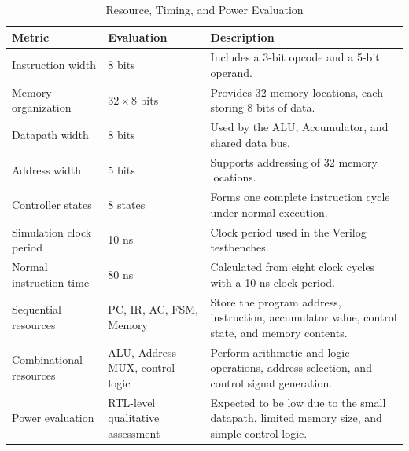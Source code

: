 \begin{table}[htbp]
	\centering
	\caption{Resource, Timing, and Power Evaluation}
	\label{tab:resource_timing_power}
	\small
	\renewcommand{\arraystretch}{1.15}
	\begin{tabularx}{\textwidth}{@{}p{} p{} X@{}}
		\toprule
		\textbf{Metric}         & \textbf{Evaluation}              & \textbf{Description}                                                                           \\
		\midrule
		Instruction width       & 8 bits                           & Includes a 3-bit opcode and a 5-bit operand.                                                   \\

		Memory organization     & \(32 \times 8\) bits             & Provides 32 memory locations, each storing 8 bits of data.                                     \\

		Datapath width          & 8 bits                           & Used by the ALU, Accumulator, and shared data bus.                                             \\

		Address width           & 5 bits                           & Supports addressing of 32 memory locations.                                                    \\

		Controller states       & 8 states                         & Forms one complete instruction cycle under normal execution.                                   \\

		Simulation clock period & 10 ns                            & Clock period used in the Verilog testbenches.                                                  \\

		Normal instruction time & 80 ns                            & Calculated from eight clock cycles with a 10 ns clock period.                                  \\

		Sequential resources    & PC, IR, AC, FSM, Memory          & Store the program address, instruction, accumulator value, control state, and memory contents. \\

		Combinational resources & ALU, Address MUX, control logic  & Perform arithmetic and logic operations, address selection, and control signal generation.     \\

		Power evaluation        & RTL-level qualitative assessment & Expected to be low due to the small datapath, limited memory size, and simple control logic.   \\
		\bottomrule
	\end{tabularx}
\end{table}


